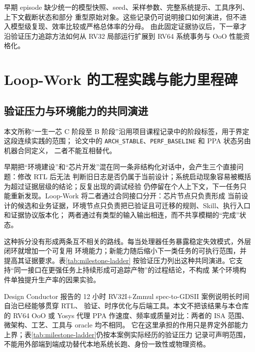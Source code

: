 \documentclass[UTF8,a4paper,zihao=-4,oneside]{ctexart}
\newcommand{\statusword}[1]{\texttt{#1}}
\begin{document}
早期 episode 缺少统一的模型快照、seed、采样参数、完整系统提示、工具序列、上下文截断状态和部分
重型原始对象。这些记录仍可说明接口如何演进，但不进入模型级复现、效率比较或严格总体率的分母。
由此固定证据协议后，下一章才沿验证压力追踪方法如何从 RV32 局部运行扩展到 RV64 系统事务与 OoO
性能资格化。

\section{Loop-Work 的工程实践与能力里程碑}

\subsection{验证压力与环境能力的共同演进}

本文所称“一生一芯 C 阶段至 B 阶段”沿用项目课程记录中的阶段标签，用于界定这段连续实践的范围；
论文中的 \statusword{ARCH\_STABLE}、\statusword{PERF\_BASELINE} 和 PPA 状态另由机器合同定义，
二者不能互相替代。

早期把“环境建设”和“芯片开发”混在同一条非结构化对话中，会产生三个直接问题：修改 RTL 后无法
判断旧日志是否仍属于当前设计；系统启动现象容易被概括为超过证据层级的结论；反复出现的调试经验
仍停留在个人上下文，下一任务只能重新发现。Loop-Work 将二者通过合同接口分开：芯片节点只负责形成
当前设计的候选和业务证据，环境节点只负责把已验证且可迁移的规则、Skill、执行入口和证据协议版本化；
两者通过有类型的输入输出相连，而不共享模糊的“完成”状态。

这种拆分没有形成两条互不相关的路线。每当处理器任务暴露稳定失效模式，外层闭环就增加一个可复用
环境能力；新能力随后缩小下一类任务的可执行范围，并提高其证据要求。表\ref{tab:milestone-ladder}
按验证压力列出这种共同演进。它支持“同一接口在更强任务上持续形成可追踪产物”的过程结论，不构成
某个环境构件单独提升生产率的因果实验。

Design Conductor 报告的 12 小时 RV32I+Zmmul spec-to-GDSII 案例说明长时间自治已经能够贯穿 RTL、
验证、时序优化与后端工具\cite{verkor2026designconductor}。本文不把该结果与本仓库的 RV64 OoO 或
Yosys 代理 PPA 作速度、频率或质量对比：两者的 ISA 范围、微架构、工艺、工具与 oracle 均不相同。
它在这里承担的作用只是界定外部能力上界；表\ref{tab:milestone-ladder}仍按本案例实际经历的验证压力
记录可声明范围，不能用外部端到端成功替代本地系统长跑、身份一致性或物理资格。
\end{document}

